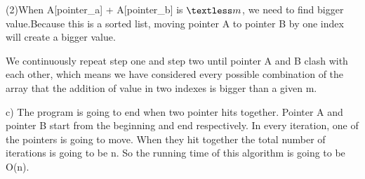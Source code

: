 \documentclass[12pt]{article}
\begin{document}
(2)When A[pointer\_a] + A[pointer\_b] is \begin{math}\textless m\end{math}, we need to find bigger value.Because this is a sorted list, moving pointer A to pointer B by one index will create a bigger value. 

We continuously repeat step one and step two until pointer A and B clash with each other, which means we have considered every
possible combination of the array that the addition of value in two indexes is bigger than a given m.



c) 
The program is going to end when two pointer hits together. Pointer A and pointer B start from the beginning and end respectively. In every iteration, 
one of the pointers is going to move.
When they hit together the total number of iterations is going to be n. So the running time of this algorithm is going to be O(n).
\end{document}
